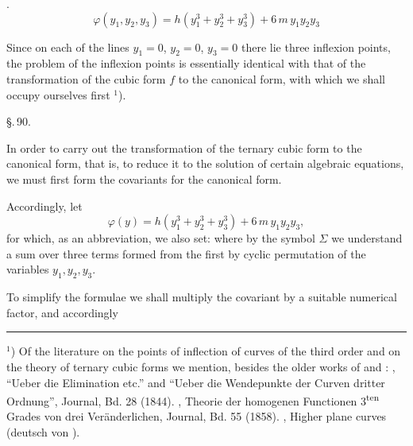 
.\ 
\[
\varphi(y_1,y_2,y_3) = h(y_1^3+y_2^3+y_3^3) + 6\,m\,y_1y_2y_3
\]

Since on each of the lines $y_1=0$, $y_2=0$, $y_3=0$ there lie three inflexion points, the problem of the inflexion points is essentially identical with that of the transformation of the cubic form $f$ to the canonical form, with which we shall occupy ourselves first $^1$).

\begin{center}
\S.\,90.

\end{center}

In order to carry out the transformation of the ternary cubic form to the canonical form, that is, to reduce it to the solution of certain algebraic equations, we must first form the covariants for the canonical form.

Accordingly, let
\[
\varphi(y) = h(y_1^3+y_2^3+y_3^3) + 6\,m\,y_1y_2y_3,
\]
for which, as an abbreviation, we also set:
where by the symbol $\Sigma$ we understand a sum over three terms formed from the first by cyclic permutation of the variables $y_1,y_2,y_3$.

To simplify the formulae we shall multiply the  covariant by a suitable numerical factor, and accordingly

\medskip
\noindent\rule{4cm}{0.4pt}

\smallskip
\noindent $^1$) Of the literature on the points of inflection of curves of the third order and on the theory of ternary cubic forms we mention, besides the older works of  and : , ``Ueber die Elimination etc.'' and ``Ueber die Wendepunkte der Curven dritter Ordnung'',  Journal, Bd. 28 (1844). , Theorie der homogenen Functionen 3\textsuperscript{ten} Grades von drei Veränderlichen,  Journal, Bd. 55 (1858). , Higher plane curves (deutsch von ).

